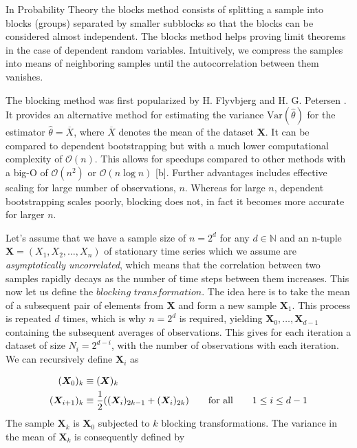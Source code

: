 In Probability Theory the blocks method consists of splitting a sample into blocks (groups) separated by smaller subblocks so that the blocks can be considered almost independent. The blocks method helps proving limit theorems in the case of dependent random variables. Intuitively, we compress the samples into means of neighboring samples until the autocorrelation between them vanishes. 

The blocking method was first popularized by H. Flyvbjerg and H. G. Petersen \citep{doi:10.1063/1.457480}. It provides an alternative method for estimating the variance $\text{Var}(\hat{\theta})$ for the estimator $\hat{\theta} = \overline{X}$, where $\overline{X}$ denotes the mean of the dataset $\bm{X}$. It can be compared to dependent bootstrapping but with a much lower computational complexity of $\mathcal{O}(n)$. This allows for speedups compared to other methods with a big-O of $\mathcal{O}(n^2)$ or $\mathcal{O}(n \log n)$ [b]. Further advantages includes effective scaling for large number of observations,  $n$. Whereas for large $n$, dependent bootstrapping scales poorly, blocking does not, in fact it becomes more accurate for larger $n$.  

Let's assume that we have a sample size of $n = 2^d$ for any $d \in \mathbb{N}$ and an n-tuple $\bm{X} = (X_1, X_2, \dots, X_n)$ of stationary time series which we assume are \textit{asymptotically uncorrelated}, which means that the correlation between two samples rapidly decays as the number of time steps between them increases. This now let us define the $\textit{blocking transformation}$. The idea here is to take the mean of a subsequent pair of elements from $\bm{X}$ and form a new sample $\bm{X}_1$. This process is repeated $d$ times, which is why $n=2^d$ is required, yielding $\bm{X}_0, \dots, \bm{X}_{d-1}$ containing the subsequent averages of observations. This gives for each iteration a dataset of size $N_i = 2^{d-i}$, with the number of observations with each iteration. We can recursively define $\bm{X}_i$ as

\begin{align*}
(\bm{X}_0)_k &\equiv (\bm{X})_k \nonumber \\
(\bm{X}_{i+1})_k &\equiv \frac{1}{2}\qty( (\bm{X}_i)_{2k-1} +
(\bm{X}_i)_{2k} ) \qquad \text{for all} \qquad 1 \leq i \leq d-1
\label{eq:recursiveX}
\end{align*}
The sample $\bm{X}_k$ is $\bm{X}_0$ subjected to $k$ blocking transformations.
The variance in the mean of $\bm{X}_k$ is consequently defined by

